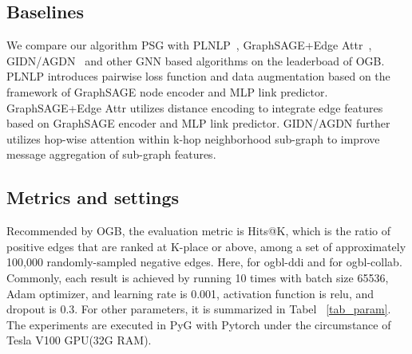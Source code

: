 \documentclass[sigconf]{acmart}
\begin{document}
\subsection{Baselines} We compare our algorithm PSG with PLNLP~\cite{wang2021pairwise}, GraphSAGE+Edge Attr~\cite{shitao2021struct}, GIDN/AGDN~\cite{wang2022gidn, sun2020adaptive} and other GNN based algorithms on the leaderboad of OGB. PLNLP introduces pairwise loss function and data augmentation based on the framework of GraphSAGE node encoder and MLP link predictor. GraphSAGE+Edge Attr utilizes distance encoding to integrate edge features based on GraphSAGE encoder and MLP link predictor. GIDN/AGDN further utilizes hop-wise attention within k-hop neighborhood sub-graph to improve message aggregation of sub-graph features. 

\subsection{Metrics and settings} Recommended by OGB, the evaluation metric is Hits@K, which is the ratio of positive edges that are ranked at K-place or above, among a set of approximately 100,000 randomly-sampled negative edges. Here,  for ogbl-ddi and  for ogbl-collab. Commonly, each result is achieved by running 10 times with batch size 65536, Adam optimizer, and learning rate is 0.001, activation function is relu, and dropout is 0.3. For other parameters, it is summarized in Tabel ~\ref{tab_param}. The experiments are executed in PyG with Pytorch under the circumstance of Tesla V100 GPU(32G RAM).
\end{document}
